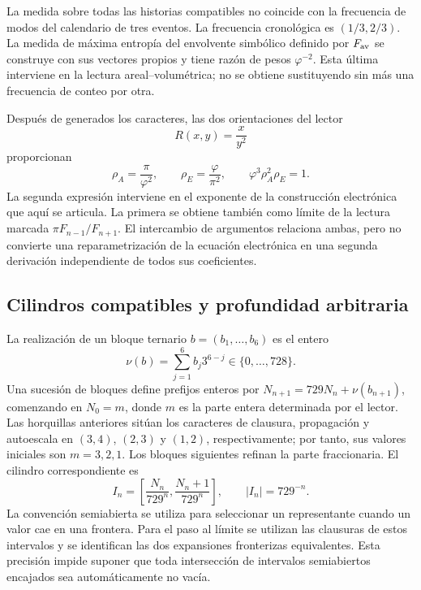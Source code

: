La medida sobre todas las historias compatibles no coincide con la frecuencia de modos del calendario de tres eventos. La frecuencia cronológica es \((1/3,2/3)\). La medida de máxima entropía del envolvente simbólico definido por \(F_{\rm av}\) se construye con sus vectores propios y tiene razón de pesos \(\varphi^{-2}\). Esta última interviene en la lectura areal--volumétrica; no se obtiene sustituyendo sin más una frecuencia de conteo por otra.



Después de generados los caracteres, las dos orientaciones del lector
\[
 R(x,y)=\frac{x}{y^2}
\]
proporcionan
\begin{equation}
 \rho_A=\frac\pi{\varphi^2},\qquad
 \rho_E=\frac\varphi{\pi^2},\qquad
 \varphi^3\rho_A^2\rho_E=1.
 \label{eq:areal-electron}
\end{equation}
La segunda expresión interviene en el exponente de la construcción electrónica que aquí se articula. La primera se obtiene también como límite de la lectura marcada \(\pi F_{n-1}/F_{n+1}\). El intercambio de argumentos relaciona ambas, pero no convierte una reparametrización de la ecuación electrónica en una segunda derivación independiente de todos sus coeficientes.



\subsection{Cilindros compatibles y profundidad arbitraria}

La realización de un bloque ternario \(b=(b_1,\ldots,b_6)\) es el entero
\[
 \nu(b)=\sum_{j=1}^6b_j3^{6-j}\in\{0,\ldots,728\}.
\]
Una sucesión de bloques define prefijos enteros por \(N_{n+1}=729N_n+\nu(b_{n+1})\), comenzando en \(N_0=m\), donde \(m\) es la parte entera determinada por el lector. Las horquillas anteriores sitúan los caracteres de clausura, propagación y autoescala en \((3,4)\), \((2,3)\) y \((1,2)\), respectivamente; por tanto, sus valores iniciales son \(m=3,2,1\). Los bloques siguientes refinan la parte fraccionaria. El cilindro correspondiente es
\begin{equation}
 I_n=\left[\frac{N_n}{729^n},\frac{N_n+1}{729^n}\right],
 \qquad |I_n|=729^{-n}.
 \label{eq:cilindro}
\end{equation}
La convención semiabierta se utiliza para seleccionar un representante cuando un valor cae en una frontera. Para el paso al límite se utilizan las clausuras de estos intervalos y se identifican las dos expansiones fronterizas equivalentes. Esta precisión impide suponer que toda intersección de intervalos semiabiertos encajados sea automáticamente no vacía.

